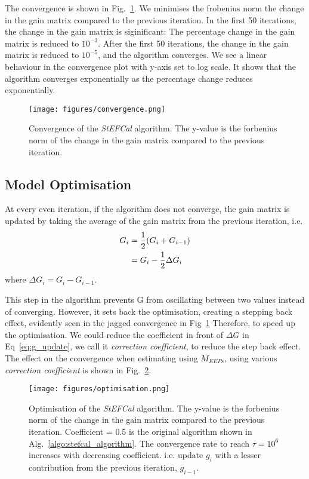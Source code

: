 \documentclass[10pt,a4paper,twocolumn]{paper}
\begin{document}
The convergence is shown in Fig.~\ref{fig:convergence}. We minimises the frobenius norm the change in the gain matrix compared to the previous iteration.
In the first 50 iterations, the change in the gain matrix is siginificant: The percentage change in the gain matrix is reduced to $10^{-3}$. After the first 50 iterations, the change in the gain matrix is reduced to $10^{-5}$, and the algorithm converges. We see a linear behaviour in the convergence plot with y-axis set to log scale. It shows that the algorithm converges exponentially as the percentage change reduces exponentially.

\begin{figure}[H]
    \centering
    \texttt{[image: figures/convergence.png]}
    \caption{Convergence of the \textit{StEFCal} algorithm. The y-value is the forbenius norm of the change in the gain matrix compared to the previous iteration.}
    \label{fig:convergence}
\end{figure}

\subsection{Model Optimisation}
At every even iteration, if the algorithm does not converge, the gain matrix is updated by taking the average of the gain matrix from the previous iteration, i.e.
\begin{align}
    G_i &= \frac{1}{2} (G_i + G_{i-1}) \notag\\
    &= G_i - \frac{1}{2}\Delta G_i
    \label{eq:g_update}
\end{align}
where $\Delta G_i = G_i - G_{i-1}$. 

This step in the algorithm prevents G from oscillating between two values instead of converging. However, it sets back the optimisation, creating a stepping back effect, evidently seen in the jagged convergence in Fig~\ref{fig:convergence} Therefore, to speed up the optimisation. We could reduce the coefficient in front of $\Delta G$ in Eq~\ref{eq:g_update}, we call it \textit{correction coefficient}, to reduce the step back effect.
The effect on the convergence when estimating using $M_{EEPs}$, using various \textit{correction coefficient }is shown in Fig.~\ref{fig:optimisation}.

\begin{figure}[H]
    \centering
    \texttt{[image: figures/optimisation.png]}
    \caption{Optimisation of the \textit{StEFCal} algorithm. The y-value is the forbenius norm of the change in the gain matrix compared to the previous iteration. Coefficient = 0.5 is the original algorithm shown in Alg.~\ref{algo:stefcal_algorithm}. The convergence rate to reach $\tau = 10^6$ increases with decreasing coefficient. i.e. update $g_i$ with a lesser contribution from the previous iteration, $g_{i-1}$.}
    \label{fig:optimisation}
\end{figure}
\end{document}
